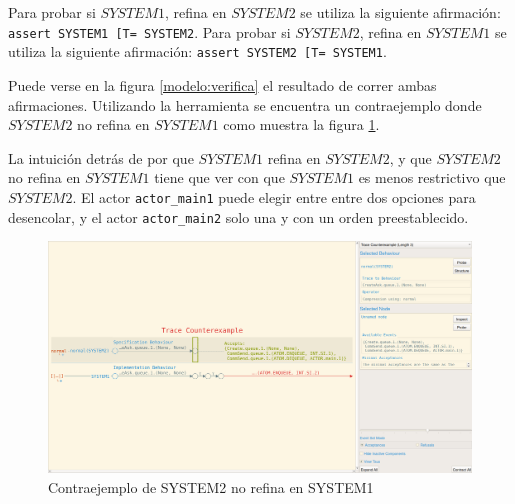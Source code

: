 Para probar si $SYSTEM1$, refina en $SYSTEM2$ se utiliza la siguiente afirmación: \verb$assert SYSTEM1 [T= SYSTEM2$. Para probar si $SYSTEM2$, refina en $SYSTEM1$ se utiliza la siguiente afirmación: \verb$assert SYSTEM2 [T= SYSTEM1$.

Puede verse en la figura \ref{modelo:verifica} el resultado de correr ambas afirmaciones. Utilizando la herramienta se encuentra un contraejemplo donde $SYSTEM2$ no refina en $SYSTEM1$ como muestra la figura \ref{modelo:contraejemplo}.

La intuición detrás de por que $SYSTEM1$ refina en $SYSTEM2$, y que $SYSTEM2$ no refina en $SYSTEM1$ tiene que ver con que $SYSTEM1$ es menos restrictivo que $SYSTEM2$. El actor \verb=actor_main1= puede elegir entre entre dos opciones para desencolar, y el actor \verb=actor_main2= solo una y con un orden preestablecido.

\begin{figure}
\begin{center}
\includegraphics[width=15 cm]{img/contraejemplo.png}
\caption{Contraejemplo de SYSTEM2 no refina en SYSTEM1}\label{modelo:contraejemplo}
\end{center}
\end{figure}
 
